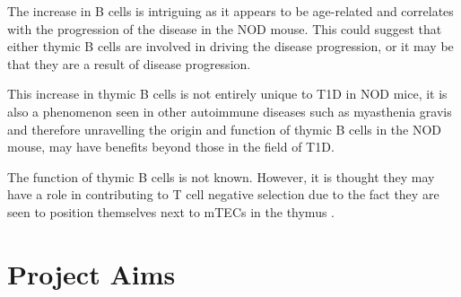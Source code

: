 


The increase in B cells is intriguing as it appears to be age-related and correlates with the progression of the disease in the NOD mouse.
This could suggest that either thymic B cells are involved in driving the disease progression, or it may be that they are a result of disease progression.

This increase in thymic B cells is not entirely unique to T1D in NOD mice, it is also a phenomenon seen in other autoimmune diseases such as myasthenia gravis \citep{Vrolix2014, Christensson1988} and therefore unravelling the origin and function of thymic B cells in the NOD mouse, may have benefits beyond those in the field of T1D.

The function of thymic B cells is not known.
However, it is thought they may have a role in contributing to T cell negative selection due to the fact they are seen to position themselves next to mTECs in the thymus .



\section{Project Aims}

